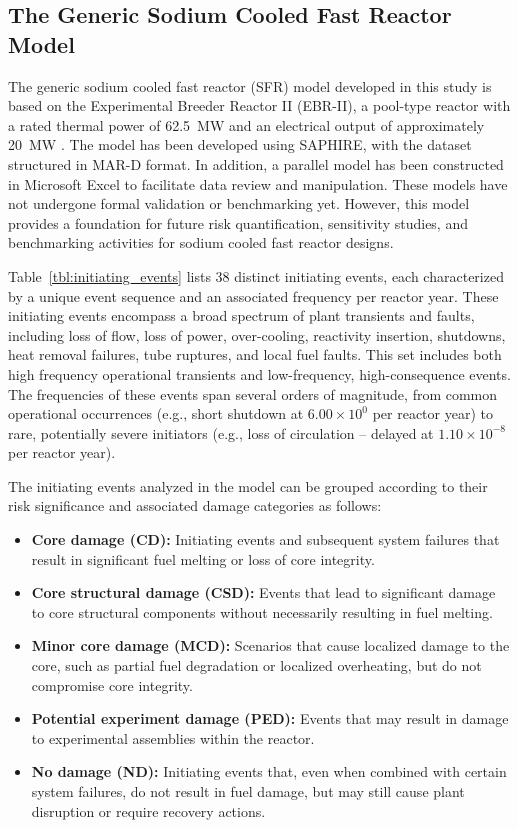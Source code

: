 \subsection{The Generic Sodium Cooled Fast Reactor Model}

The generic sodium cooled fast reactor (SFR) model developed in this study is based on the Experimental Breeder Reactor II (EBR-II), a pool-type reactor with a rated thermal power of 62.5~MW and an electrical output of approximately 20~MW \cite{chang_experimental_2018}. The model has been developed using SAPHIRE, with the dataset structured in MAR-D format. In addition, a parallel model has been constructed in Microsoft Excel to facilitate data review and manipulation. These models have not undergone formal validation or benchmarking yet. However, this model provides a foundation for future risk quantification, sensitivity studies, and benchmarking activities for sodium cooled fast reactor designs.

Table~\ref{tbl:initiating_events} lists 38 distinct initiating events, each characterized by a unique event sequence and an associated frequency per reactor year. These initiating events encompass a broad spectrum of plant transients and faults, including loss of flow, loss of power, over-cooling, reactivity insertion, shutdowns, heat removal failures, tube ruptures, and local fuel faults. This set includes both high frequency operational transients and low-frequency, high-consequence events. The frequencies of these events span several orders of magnitude, from common operational occurrences (e.g., short shutdown at $6.00 \times 10^{0}$ per reactor year) to rare, potentially severe initiators (e.g., loss of circulation -- delayed at $1.10 \times 10^{-8}$ per reactor year).

The initiating events analyzed in the model can be grouped according to their risk significance and associated damage categories as follows:

\begin{itemize}
    \item \textbf{Core damage (CD):} Initiating events and subsequent system failures that result in significant fuel melting or loss of core integrity.
    \item \textbf{Core structural damage (CSD):} Events that lead to significant damage to core structural components without necessarily resulting in fuel melting.
    \item \textbf{Minor core damage (MCD):} Scenarios that cause localized damage to the core, such as partial fuel degradation or localized overheating, but do not compromise core integrity.
    \item \textbf{Potential experiment damage (PED):} Events that may result in damage to experimental assemblies within the reactor.
    \item \textbf{No damage (ND):} Initiating events that, even when combined with certain system failures, do not result in fuel damage, but may still cause plant disruption or require recovery actions.
\end{itemize}

